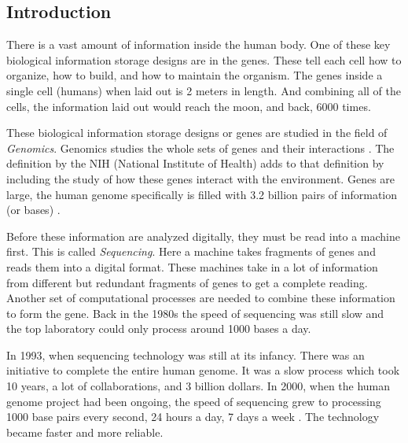 \documentclass[acmsmall]{acmart}
\begin{document}
\begin{multicols}{2}

\section{Introduction}

There is a vast amount of information inside the human body. One of these key biological information storage designs are in the genes. These tell each cell how to organize, how to build, and how to maintain the organism\cite{alberts_mole}. The genes inside a single cell (humans) when laid out is 2 meters in length.\cite{ency_sci_tech} And combining all of the cells, the information laid out would reach the moon, and back, 6000 times. 

These biological information storage designs or genes are studied in the field of \textit{Genomics}. Genomics studies the whole sets of genes and their interactions \cite[~p.437]{campbell}. The definition by the NIH (National Institute of Health) adds to that definition by including the study of how these genes interact with the environment.\cite{genomics-definition} Genes are large, the human genome specifically is filled with 3.2 billion pairs of information (or bases) \cite{introgenomics}.

Before these information are analyzed digitally, they must be read into a machine first. This is called \textit{Sequencing}. Here a machine takes fragments of genes and reads them into a digital format. These machines take in a lot of information from different but redundant fragments of genes to get a complete reading. Another set of computational processes are needed to combine these information to form the gene. Back in the 1980s the speed of sequencing was still slow and the top laboratory could only process around 1000 bases a day\cite{campbell}.

In 1993, when sequencing technology was still at its infancy. There was an initiative to complete the entire human genome\cite{introgenomics}. It was a slow process which took 10 years, a lot of collaborations, and 3 billion dollars. In 2000, when the human genome project had been ongoing, the speed of sequencing grew to processing 1000 base pairs every second, 24 hours a day, 7 days a week \cite{campbell}. The technology became faster and more reliable.


\end{multicols}
\end{document}
